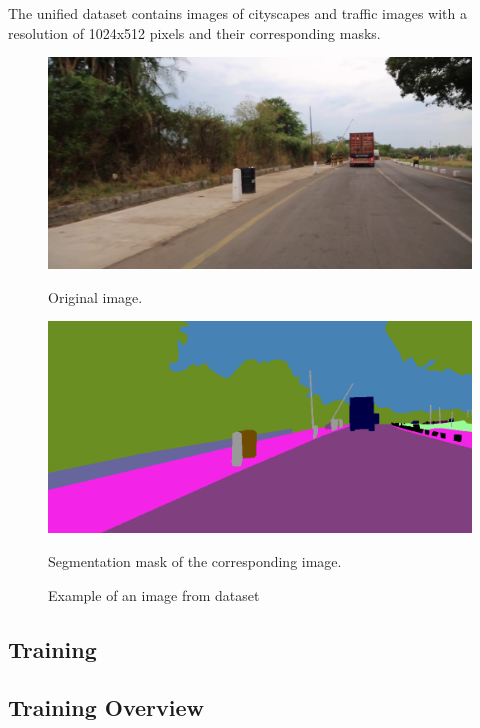 \documentclass[12pt,a4paper]{report}
\begin{document}
The unified dataset contains images of cityscapes and traffic images with a resolution of 1024x512 pixels and their corresponding masks.

\begin{figure}[h]
    \centering
    \begin{minipage}{0.45\textwidth}
        \centering
        \includegraphics[width=\textwidth]{zw0000_100000.jpg}
        \caption{Original image.}
        \label{fig:image1}
    \end{minipage}
    \hfill
    \begin{minipage}{0.45\textwidth}
        \centering
        \includegraphics[width=\textwidth]{zw0000_100000_labelIds.png}
        \caption{Segmentation mask of the corresponding image.}
        \label{fig:image2}
    \end{minipage}
    \caption{Example of an image from dataset}
    \label{fig:combined_images}
\end{figure}

\subsection*{Training}

\subsection*{Training Overview}
\end{document}
